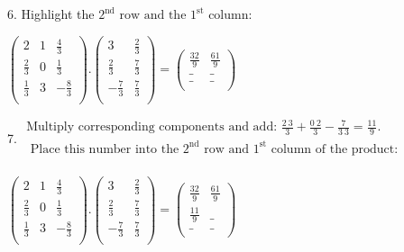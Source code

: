 \documentclass{article}
\begin{document}
6. Highlight the $2^{\text{nd}}\text{ row and the }1^{\text{st}}$ column:

$\left(
        \begin{array}{ccc}
2           & 1 & \frac{4}{3}  \\
                \frac{2}{3} & 0 & \frac{1}{3}  \\
                \frac{1}{3} & 3 & -\frac{8}{3} \\
            \end{array}
        \right).\left(
        \begin{array}{cc}
3            & \frac{2}{3} \\
                \frac{2}{3}  & \frac{7}{3} \\
                -\frac{7}{3} & \frac{7}{3} \\
            \end{array}
        \right)=\left(
        \begin{array}{cc}
\frac{32}{9} & \frac{61}{9} \\
                \_           & \_           \\
                \_           & \_           \\
            \end{array}
        \right)$

7. $\begin{array}{l}
\text{Multiply corresponding components and add: }\frac{2\ 3}{3}+\frac{0\ 2}{3}-\frac{7}{3\ 3}=\frac{11}{9}.                           \\
\text{            Place this number into the }2^{\text{nd}}\text{ row and }1^{\text{st}}\text{ column of the product}: \\
        \end{array}$

$\left(
        \begin{array}{ccc}
2           & 1 & \frac{4}{3}  \\
                \frac{2}{3} & 0 & \frac{1}{3}  \\
                \frac{1}{3} & 3 & -\frac{8}{3} \\
            \end{array}
        \right).\left(
        \begin{array}{cc}
3            & \frac{2}{3} \\
                \frac{2}{3}  & \frac{7}{3} \\
                -\frac{7}{3} & \frac{7}{3} \\
            \end{array}
        \right)=\left(
        \begin{array}{cc}
\frac{32}{9}          & \frac{61}{9} \\
                \frac{11}{9} & \_           \\
                \_                    & \_           \\
            \end{array}
        \right)$
\end{document}
